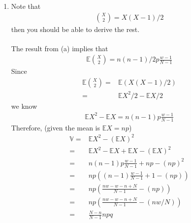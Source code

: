 \begin{exercise} [BH.4.48]
\begin{solution}
\begin{enumerate}
{    We could choose arbitrary order here by symmetry, and some order (like the order we choose here) leads to easier calculations.
    }, then $\{I_1=1\}$ means the first two balls you draw from the box (w+b balls) is a white pair: 
    \begin{align*}
    \mathbb{P}\{I_1=1\} = \mathbb{P}(A_{1w}) \mathbb{P}(A_{2w}|A_{1w})=\frac{w}{w+b}\frac{w-1}{w+b-1}
    \end{align*} 
    where $A_{iw}$ denotes the $i$th ball drawn from the box is white. Therefore, we know 
    \begin{align*}
        \mathbb{E}\binom{X}{2} = \sum_{i=1}^{\binom{n}{2}} \frac{w}{w+b}\frac{w-1}{w+b-1} =\binom{n}{2}\frac{w}{w+b}\frac{w-1}{w+b-1}
    \end{align*}
    \item Note that 
    \begin{align*}
        \binom{X}{2}= X(X-1)/2
    \end{align*}
    then you should be able to derive the rest.\\~\\
    The result from (a) implies that 
    \begin{align*}
        \mathbb{E}	\binom{X}{2}= n(n-1)/2 p \frac{w-1}{N-1}
    \end{align*} 
    Since
    \begin{align*}
        \mathbb{E}	\binom{X}{2} =& \mathbb{E} (X(X-1)/2) \\
        =& \mathbb{E} X^2/2- \mathbb{E} X/2 
    \end{align*}
    we know 
    \begin{align*}
        \mathbb{E}X^2 - \mathbb{E}X=  n(n-1) p \frac{w-1}{N-1}
    \end{align*}
    Therefore, (given the mean is $\mathbb{E}X=np$) 
    \begin{align*}
        \mathbb{V} =& 	\mathbb{E}X^2 - (\mathbb{E}X)^2\\
        =&  	\mathbb{E}X^2 -\mathbb{E}X +\mathbb{E}X- (\mathbb{E}X)^2\\
        =&  	 n(n-1) p \frac{w-1}{N-1} + np -(np)^2 \\
        =&  	 np \left((n-1)  \frac{w-1}{N-1} + 1 -(np)\right) \\
        =&  	 np \left(  \frac{nw-w-n+N}{N-1}  -(np)\right) \\
        =&  	 np \left(  \frac{nw-w-n+N}{N-1}  -(nw/N)\right) \\
        =&  \frac{N-n}{N-1}npq
    \end{align*}
\end{enumerate}
\end{solution}
\end{exercise}

